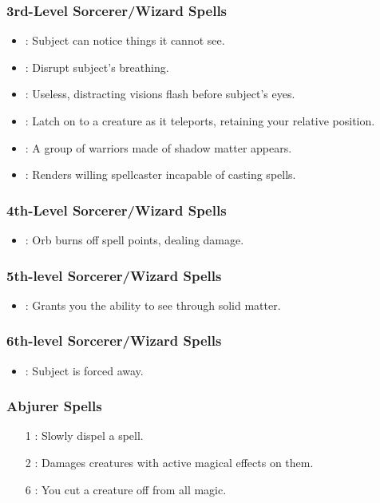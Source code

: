 \subsubsection{3rd-Level Sorcerer/Wizard Spells}
\begin{itemize}
 \item {}: Subject can notice things it cannot see.
 \item {}: Disrupt subject's breathing.
 \item {}: Useless, distracting visions flash before subject's eyes.
 \item {}: Latch on to a creature as it teleports, retaining your relative position.
 \item {}: A group of warriors made of shadow matter appears.
 \item {}: Renders willing spellcaster incapable of casting spells.
\end{itemize}
\subsubsection{4th-Level Sorcerer/Wizard Spells}
\begin{itemize}
 \item {}: Orb burns off spell points, dealing damage.
\end{itemize}
\subsubsection{5th-level Sorcerer/Wizard Spells}
\begin{itemize} 
 \item {}: Grants you the ability to see through solid matter.
\end{itemize}
\subsubsection{6th-level Sorcerer/Wizard Spells}
\begin{itemize}
 \item {}: Subject is forced away.
\end{itemize}

\subsubsection{Abjurer Spells}
\begin{itemize}
 \item[1] : Slowly dispel a spell.
 \item[2] : Damages creatures with active magical effects on them.
 \item[6] : You cut a creature off from all magic.
\end{itemize}

